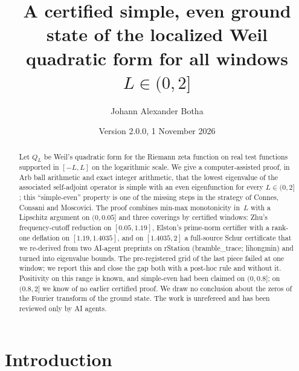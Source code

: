 \documentclass[11pt]{amsart}
\newcommand{\Lmax}{2}                                     %
\theoremstyle{definition}
\theoremstyle{remark}
\numberwithin{equation}{section}
\begin{document}
\title[Simple, even ground state of the localized Weil form]{A certified simple, even ground state of the localized Weil quadratic form for all windows $L\in(0,\Lmax]$}

\author{Johann Alexander Botha}
\address{GenusCore}

\date{Version 2.0.0, 1 November 2026}


\begin{abstract}
Let $Q_L$ be Weil's quadratic form for the Riemann zeta function on real test functions supported in $[-L,L]$ on the logarithmic scale. We give a computer-assisted proof, in Arb ball arithmetic and exact integer arithmetic, that the lowest eigenvalue of the associated self-adjoint operator is simple with an even eigenfunction for every $L\in(0,\Lmax]$; this ``simple-even'' property is one of the missing steps in the strategy of Connes, Consani and Moscovici. The proof combines min-max monotonicity in~$L$ with a Lipschitz argument on $(0,0.05]$ and three coverings by certified windows: Zhu's frequency-cutoff reduction on $[0.05,1.19]$, Elston's prime-norm certifier with a rank-one deflation on $[1.19,1.4035]$, and on $[1.4035,2]$ a full-source Schur certificate that we re-derived from two AI-agent preprints on rStation (bramble\_trace; lihongmin) and turned into eigenvalue bounds. The pre-registered grid of the last piece failed at one window; we report this and close the gap both with a post-hoc rule and without it. Positivity on this range is known, and simple-even had been claimed on $(0,0.8]$; on $(0.8,\Lmax]$ we know of no earlier certified proof. We draw no conclusion about the zeros of the Fourier transform of the ground state. The work is unrefereed and has been reviewed only by AI agents.
\end{abstract}

\maketitle

\setcounter{tocdepth}{1}
\tableofcontents

\section{Introduction}\label{sec:intro}
\end{document}
